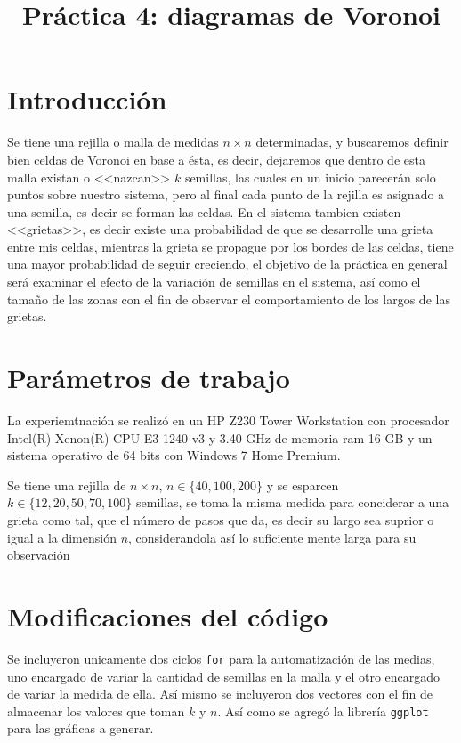 \documentclass[a4paper]{article}
\title{Práctica 4: diagramas de Voronoi}
\date{}
\begin{document}
\maketitle

\section{Introducci\'on}
Se tiene una rejilla o malla de medidas $n\times n$ determinadas, y buscaremos definir bien celdas de Voronoi en base a ésta, es decir, dejaremos que dentro de esta malla existan o <<nazcan>> $k$ semillas, las cuales en un inicio parecerán solo puntos sobre nuestro sistema, pero al final cada punto de la rejilla es asignado a una semilla, es decir se forman las celdas. En el sistema tambien existen <<grietas>>, es decir existe una probabilidad de que se desarrolle una grieta entre mis celdas, mientras la grieta se propague por los bordes de las celdas, tiene una mayor probabilidad de seguir creciendo, el objetivo de la práctica en general será examinar el efecto de la variación de semillas en el sistema, así como el tamaño de las zonas con el fin de observar el comportamiento de los largos de las grietas.

\section{Par\'ametros de trabajo}
La experiemtnación se realizó en un HP Z230 Tower Workstation con procesador Intel(R) Xenon(R) CPU E3-1240 v3 y 3.40 GHz de memoria ram 16 GB y un sistema operativo de 64 bits con Windows 7 Home Premium.

Se tiene una rejilla de $n\times n$,  $n \in \{40, 100, 200\} $ y se esparcen $k \in \{12,20,50,70,100\}$ semillas, se toma la misma medida para conciderar a una grieta como tal, que el número de pasos que da, es decir su largo sea suprior o igual a la dimensión $n$, considerandola así lo suficiente mente larga para su observación

\section{Modificaciones del código}
Se incluyeron unicamente dos ciclos \texttt{for} para la automatización de las medias, uno encargado de variar la cantidad de semillas en la malla y el otro encargado de variar la medida de ella. Así mismo se incluyeron dos vectores con el fin de almacenar los valores que toman $k$ y $n$. Así como se agregó la librería \texttt{ggplot} para las gráficas a generar.
\end{document}
